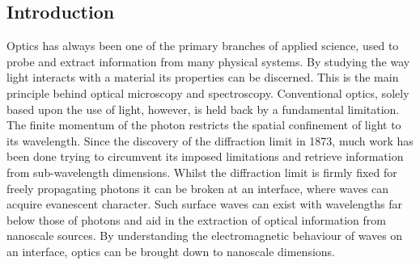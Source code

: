 \documentclass[12pt, a4paper, twoside]{book}
\begin{document}
\begin{singlespace}
\color{white}\chapter{Introduction}
\end{singlespace}


Optics has always been one of the primary branches of applied science, used to probe and extract information from many physical systems. By studying the way light interacts with a material its properties can be discerned. This is the main principle behind optical microscopy and spectroscopy. Conventional optics, solely based upon the use of light, however, is held back by a fundamental limitation. The finite momentum of the photon restricts the spatial confinement of light to its wavelength. Since the discovery of the diffraction limit in 1873, much work has been done trying to circumvent its imposed limitations and retrieve information from sub-wavelength dimensions. Whilst the diffraction limit is firmly fixed for freely propagating photons it can be broken at an interface, where waves can acquire evanescent character. Such surface waves can exist with wavelengths far below those of photons and aid in the extraction of optical information from nanoscale sources. By understanding the electromagnetic behaviour of waves on an interface, optics can be brought down to nanoscale dimensions.
\end{document}
